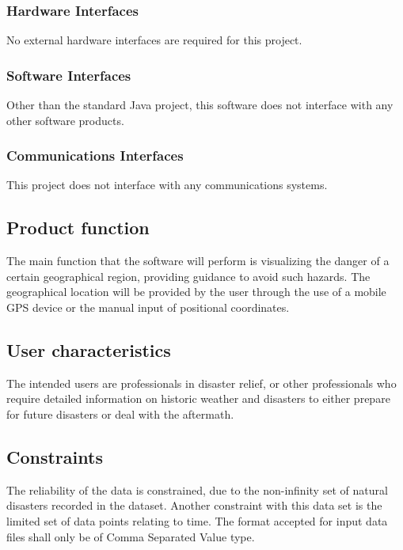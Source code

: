 \documentclass{article}
\begin{document}
	\subsubsection{Hardware Interfaces}
		No external hardware interfaces are required for this project.
 
	\subsubsection{Software Interfaces}
        Other than the standard Java project, this software does not 
        interface with any other software products.
 
	\subsubsection{Communications Interfaces}
		This project does not interface with any communications systems.
 
    \subsection{Product function}
        The main function that the software will perform is visualizing the 
        danger of a certain geographical region, providing guidance to avoid such 
        hazards. The geographical location will be provided by the user through the use 
        of a mobile GPS device or the manual input of positional coordinates.   
         
    \subsection{User characteristics}
         
        The intended users are professionals in disaster relief, or other professionals 
        who require detailed information on historic weather and disasters to either 
        prepare for future disasters or deal with the aftermath.
     
\subsection{Constraints}
The reliability of the data is constrained, due to the non-infinity set of natural disasters recorded 
in the dataset. Another constraint with this data set is the limited set of data points relating to time.
The format accepted for input data files shall only be of Comma Separated Value type.
 
\end{document}
